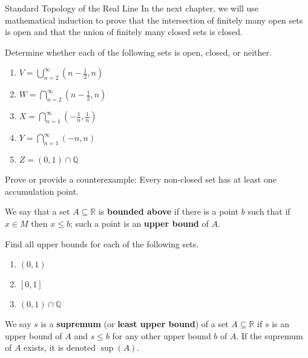 \begin{section}{Standard Topology of the Real Line}
In the next chapter, we will use mathematical induction to prove that the intersection of finitely many open sets is open and that the union of finitely many closed sets is closed.

\begin{problem}
Determine whether each of the following sets is open, closed, or neither.
\begin{enumerate}[label=\textrm{(\alph*)}]
\item $\displaystyle V=\bigcup_{n=2}^{\infty} \left(n - \frac{1}{2},n\right)$
\item $\displaystyle W=\bigcap_{n=2}^{\infty} \left(n - \frac{1}{2},n\right)$
\item $\displaystyle X=\bigcap_{n=1}^{\infty} \left(-\frac{1}{n}, \frac{1}{n}\right)$
\item $\displaystyle Y=\bigcap_{n=1}^{\infty} \left(-n, n\right)$
\item $Z=(0,1)\cap \mathbb{Q}$
\end{enumerate}
\end{problem}

\begin{problem}
Prove or provide a counterexample: Every non-closed set has at least one accumulation point.
\end{problem}

\begin{definition}
We say that a set $A\subseteq \mathbb{R}$ is \textbf{bounded above} if there is a point $b$ such that if $x\in M$ then $x\leq b$; such a point is an \textbf{upper bound} of $A$.
\end{definition}

\begin{problem}\label{prob:find upper bounds}
Find all upper bounds for each of the following sets.
\begin{enumerate}[label=\textrm{(\alph*)}]
\item $(0,1)$
\item $[0,1]$
\item $(0,1)\cap \mathbb{Q}$
\end{enumerate}
\end{problem}

\begin{definition}
We say $s$ is a \textbf{supremum} (or \textbf{least upper bound}) of a set $A\subseteq \mathbb{R}$ if $s$ is an upper bound of $A$ and $s\leq b$ for any other upper bound $b$ of $A$. If the supremum of $A$ exists, it is denoted $\boxed{\sup(A)}$.
\end{definition}


\end{section}

